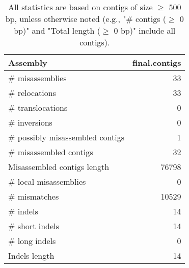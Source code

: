 \documentclass[12pt,a4paper]{article}
\begin{document}
\begin{table}[ht]
\begin{center}
\caption{All statistics are based on contigs of size $\geq$ 500 bp, unless otherwise noted (e.g., "\# contigs ($\geq$ 0 bp)" and "Total length ($\geq$ 0 bp)" include all contigs).}
\begin{tabular}{|l*{1}{|r}|}
\hline
Assembly & final.contigs \\ \hline
\# misassemblies & 33 \\ \hline
\hspace{5mm}\# relocations & 33 \\ \hline
\hspace{5mm}\# translocations & 0 \\ \hline
\hspace{5mm}\# inversions & 0 \\ \hline
\# possibly misassembled contigs & 1 \\ \hline
\# misassembled contigs & 32 \\ \hline
Misassembled contigs length & 76798 \\ \hline
\# local misassemblies & 0 \\ \hline
\# mismatches & 10529 \\ \hline
\# indels & 14 \\ \hline
\hspace{5mm}\# short indels & 14 \\ \hline
\hspace{5mm}\# long indels & 0 \\ \hline
Indels length & 14 \\ \hline
\end{tabular}
\end{center}
\end{table}
\end{document}
